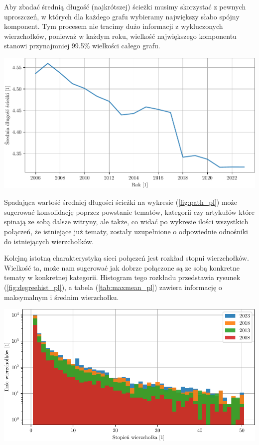 \documentclass[a4paper, 12pt]{article}
\begin{document}
Aby zbadać średnią długość (najkrótszej) ścieżki musimy skorzystać z pewnych uproszczeń, w których dla każdego grafu wybieramy największy słabo spójny komponent. Tym procesem nie tracimy dużo informacji z wykluczonych wierzchołków, ponieważ w każdym roku, wielkość największego komponentu stanowi przynajmniej 99.5\% wielkości całego grafu.

\begin{center}
    \includegraphics[width=0.90\linewidth]{figures/path_pl.pdf}
    \label{fig:path_pl}
\end{center}
Spadająca wartość średniej długości ścieżki na wykresie (\ref{fig:path_pl}) może sugerować konsolidację poprzez powstanie tematów, kategorii czy artykułów które spinają ze sobą dalsze witryny, ale także, co widać po wykresie ilości wszystkich połączeń, że istniejące już tematy, zostały uzupełnione o odpowiednie odnośniki do istniejących wierzchołków.
\newpage

Kolejną istotną charakterystyką sieci połączeń jest rozkład stopni wierzchołków. Wielkość ta, może nam sugerować jak dobrze połączone są ze sobą konkretne tematy w konkretnej kategorii. Histogram tego rozkładu przedstawia rysunek (\ref{fig:degreehist_pl}), a tabela (\ref{tab:maxmean_pl}) zawiera informację o maksymalnym i średnim wierzchołku.

\begin{center}
    \includegraphics[width=0.90\linewidth]{figures/degreehist_pl.pdf}
    \label{fig:degreehist_pl}
\end{center}
\begin{center}
    
    \label{tab:maxmean_pl}
\end{center}
\end{document}
